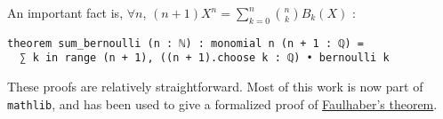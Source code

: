 \documentclass[a4paper,UKenglish,cleveref, autoref, thm-restate,pdfa]{lipics-v2021}
\newcommand{\lean}[1]{\texttt{#1}\xspace} %
\begin{document}

An important fact is, $\forall n$, $(n + 1)X^{n} = \sum_{k = 0}^{n} {n \choose k} B_k(X)$ :
\begin{lstlisting}
theorem sum_bernoulli (n : ℕ) : monomial n (n + 1 : ℚ) = 
  ∑ k in range (n + 1), ((n + 1).choose k : ℚ) • bernoulli k 
\end{lstlisting}
These proofs are relatively straightforward. Most of this work is now part of \lean{mathlib}, 
and has been used to give a formalized proof of \href{https://leanprover-community.github.io/mathlib_docs/number_theory/bernoulli.html\#sum_range_pow}{Faulhaber's theorem}.
\end{document}
